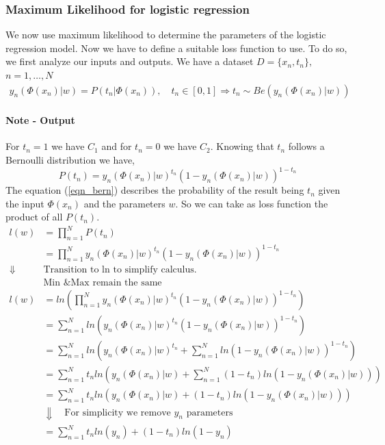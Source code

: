 \documentclass[main.tex]{subfiles}
\begin{document}
\subsubsection{Maximum Likelihood for logistic regression}
We now use maximum likelihood to determine the parameters of the logistic regression model. Now we have to define a suitable loss function to use. To do so, we first analyze our inputs and outputs. We have a dataset $D = \{x_n, t_n\},$ $n=1,\dots,N$
\begin{align*}
    y_n(\Phi(x_n)|w) = P(t_n|\Phi(x_n)), \quad t_n \in [0,1] \Rightarrow t_n \sim Be(y_n(\Phi(x_n)|w))
\end{align*}
\paragraph{Note - Output} For $t_n = 1$ we have $C_1$ and for $t_n = 0$ we have $C_2$.
\newline \newline
Knowing that $t_n$ follows a Bernoulli distribution we have,
\begin{equation}
    P(t_n) = y_n(\Phi(x_n)|w)^{t_n} (1 - y_n(\Phi(x_n)|w))^{1- t_n} \label{eqn_bern}
\end{equation}
The equation (\ref{eqn_bern}) describes the probability of the result being $t_n$ given the input $\Phi(x_n)$ and the parameters $w$. So we can take as loss function the product of all $P(t_n)$.
\begin{align*}
    l(w)             & = \prod_{n=1}^N P(t_n)                                                                      \\
                     & = \prod_{n=1}^N y_n(\Phi(x_n)|w)^{t_n} (1 - y_n(\Phi(x_n)|w))^{1- t_n}                      \\
    \Downarrow \quad & \text{Transition to ln to simplify calculus.}                                               \\
                     & \text{Min \& Max remain the same}                                                           \\
    l(w)             & = ln(\prod_{n=1}^N y_n(\Phi(x_n)|w)^{t_n} (1 - y_n(\Phi(x_n)|w))^{1- t_n})                  \\
                     & = \sum_{n=1}^N ln(y_n(\Phi(x_n)|w)^{t_n} (1 - y_n(\Phi(x_n)|w))^{1- t_n})                   \\
                     & = \sum_{n=1}^N ln(y_n(\Phi(x_n)|w)^{t_n} + \sum_{n=1}^N ln(1 - y_n (\Phi(x_n)|w))^{1- t_n}) \\
                     & = \sum_{n=1}^N t_n ln(y_n(\Phi(x_n)|w) + \sum_{n=1}^N (1 - t_n)ln(1 - y_n (\Phi(x_n)|w)))   \\
                     & = \sum_{n=1}^N t_n ln(y_n(\Phi(x_n)|w) + (1 - t_n)ln(1 - y_n (\Phi(x_n)|w)))                \\
                     & \Downarrow \quad \text{For simplicity we remove }y_n\text{ parameters}                      \\
                     & = \sum_{n=1}^N t_n ln(y_n) + (1 - t_n)ln(1 - y_n)
\end{align*}
\end{document}
